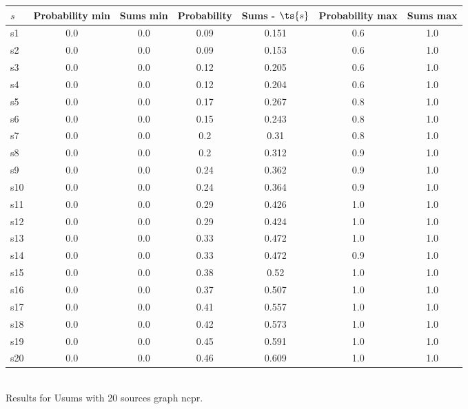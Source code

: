 \documentclass{article}
\begin{document}
\noindent\begin{tabular}{|l|c|c|c|c|c|c|}
\hline
$s$& Probability min & Sums min & Probability & Sums - $\ts{s}$ & Probability max & Sums max\\
\hline
s1 &0.0 & 0.0 & 0.09 & 0.151 & 0.6 & 1.0\\
\hline
s2 &0.0 & 0.0 & 0.09 & 0.153 & 0.6 & 1.0\\
\hline
s3 &0.0 & 0.0 & 0.12 & 0.205 & 0.6 & 1.0\\
\hline
s4 &0.0 & 0.0 & 0.12 & 0.204 & 0.6 & 1.0\\
\hline
s5 &0.0 & 0.0 & 0.17 & 0.267 & 0.8 & 1.0\\
\hline
s6 &0.0 & 0.0 & 0.15 & 0.243 & 0.8 & 1.0\\
\hline
s7 &0.0 & 0.0 & 0.2 & 0.31 & 0.8 & 1.0\\
\hline
s8 &0.0 & 0.0 & 0.2 & 0.312 & 0.9 & 1.0\\
\hline
s9 &0.0 & 0.0 & 0.24 & 0.362 & 0.9 & 1.0\\
\hline
s10 &0.0 & 0.0 & 0.24 & 0.364 & 0.9 & 1.0\\
\hline
s11 &0.0 & 0.0 & 0.29 & 0.426 & 1.0 & 1.0\\
\hline
s12 &0.0 & 0.0 & 0.29 & 0.424 & 1.0 & 1.0\\
\hline
s13 &0.0 & 0.0 & 0.33 & 0.472 & 1.0 & 1.0\\
\hline
s14 &0.0 & 0.0 & 0.33 & 0.472 & 0.9 & 1.0\\
\hline
s15 &0.0 & 0.0 & 0.38 & 0.52 & 1.0 & 1.0\\
\hline
s16 &0.0 & 0.0 & 0.37 & 0.507 & 1.0 & 1.0\\
\hline
s17 &0.0 & 0.0 & 0.41 & 0.557 & 1.0 & 1.0\\
\hline
s18 &0.0 & 0.0 & 0.42 & 0.573 & 1.0 & 1.0\\
\hline
s19 &0.0 & 0.0 & 0.45 & 0.591 & 1.0 & 1.0\\
\hline
s20 &0.0 & 0.0 & 0.46 & 0.609 & 1.0 & 1.0\\
\hline
\end{tabular}\\

\noindent Results for Usums with 20 sources graph ncpr.
\end{document}
